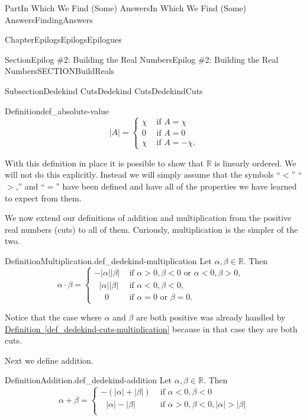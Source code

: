 \documentclass[oneside,10pt,]{book}
\newcommand{\xreffont}{\relax}
\numberwithin{equation}{part}
\newcommand{\abs}[1]{\left|#1\right|}
\newcommand{\RR}{\mathbb {R}}
\newcommand{\lt}{<}
\newcommand{\amp}{&}
\begin{document}
\begin{partptx}{Part}{In Which We Find (Some) Answers}{}{In Which We Find (Some) Answers}{}{}{FindingAnswers}
\begin{chapterptx}{Chapter}{Epilogs}{}{Epilogs}{}{}{Epilogues}
\begin{sectionptx}{Section}{Epilog \#2: Building the Real Numbers}{}{Epilog \#2: Building the Real Numbers}{}{}{SECTIONBuildReals}
\begin{subsectionptx}{Subsection}{Dedekind Cuts}{}{Dedekind Cuts}{}{}{DedekindCuts}
\begin{definition}{Definition}{}{def_absolute-value}
\begin{equation*}
\abs{A}= \begin{cases}\chi \amp  \text{ if \(A=\chi{}\)} \\ 0 \amp  \text{ if \(A=0\) } \\ \chi \amp  \text{ if \(A=-\chi{}.\)} {} \end{cases}
\end{equation*}
%
\end{definition}
With this definition in place it is possible to show that \(\RR\) is linearly ordered.  We will not do this explicitly.  Instead we will simply assume that the symbols ``\(\lt\)'' ``\(>\),'' and ``\(=\)'' have been defined and have all of the properties we have learned to expect from them.%
\par
We now extend our definitions of addition and multiplication from the positive real numbers (cuts) to all of them. Curiously, multiplication is the simpler of the two.%
\begin{definition}{Definition}{Multiplication.}{def_dedekind-multiplication}%
%
%
Let \(\alpha, \beta\in\RR\).  Then%
\begin{equation*}
\alpha\cdot\beta = \begin{cases}-\abs{\alpha}\abs{\beta}\amp  \text{ if \(\alpha>0,\beta\lt 0\) or \(\alpha\lt 0, \beta>0,\) }  \\ \ \ \,\abs{\alpha}\abs{\beta}\amp  \text{ if \(\alpha\lt 0,\beta\lt 0,\) }  \\ \ \ \ \ \ \, 0\amp  \text{ if \(\alpha=0\) or \(\beta=0.\) }  {} \end{cases}
\end{equation*}
%
\end{definition}
Notice that the case where \(\alpha\) and \(\beta\) are both positive was already handled by \hyperref[def_dedekind-cuts-multiplication]{Definition~{\xreffont\ref{def_dedekind-cuts-multiplication}}} because in that case they are both cuts.%
\par
Next we define addition.%
\begin{definition}{Definition}{Addition.}{def_dedekind-addition}%
%
%
Let \(\alpha, \beta\in\RR\).  Then%
\begin{equation*}
\alpha+\beta=
\begin{cases}
-(\abs{\alpha}+\abs{\beta}) \amp  \text{ if \(\alpha\lt 0, \beta\lt 0 \) } \\
\ \ \ \abs{\alpha}-\abs{\beta}\amp  \text{ if \(\alpha>0, \beta\lt 0, \abs{\alpha}>\abs{\beta} \)} \\

\end{cases}
\end{equation*}
\end{definition}
\end{subsectionptx}
\end{sectionptx}
\end{chapterptx}
\end{partptx}
\end{document}
